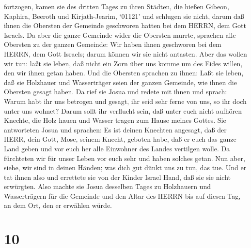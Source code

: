 fortzogen, kamen sie des dritten Tages zu ihren Städten, die hießen
Gibeon, Kaphira, Beeroth und Kirjath-Jearim,  `01121' und
schlugen sie nicht, darum daß ihnen die Obersten der Gemeinde geschworen
hatten bei dem HERRN, dem Gott Israels. Da aber die ganze Gemeinde wider
die Obersten murrte,  sprachen alle Obersten zu der ganzen
Gemeinde: Wir haben ihnen geschworen bei dem HERRN, dem Gott Israels;
darum können wir sie nicht antasten.  Aber das wollen wir
tun: laßt sie leben, daß nicht ein Zorn über uns komme um des Eides
willen, den wir ihnen getan haben.  Und die Obersten
sprachen zu ihnen: Laßt sie leben, daß sie Holzhauer und Wasserträger
seien der ganzen Gemeinde, wie ihnen die Obersten gesagt haben.
 Da rief sie Josua und redete mit ihnen und sprach: Warum
habt ihr uns betrogen und gesagt, ihr seid sehr ferne von uns, so ihr
doch unter uns wohnet?  Darum sollt ihr verflucht sein, daß
unter euch nicht aufhören Knechte, die Holz hauen und Wasser tragen zum
Hause meines Gottes.  Sie antworteten Josua und sprachen:
Es ist deinen Knechten angesagt, daß der HERR, dein Gott, Mose, seinem
Knecht, geboten habe, daß er euch das ganze Land geben und vor euch her
alle Einwohner des Landes vertilgen wolle. Da fürchteten wir für unser
Leben vor euch sehr und haben solches getan.  Nun aber,
siehe, wir sind in deinen Händen; was dich gut dünkt uns zu tun, das
tue.  Und er tat ihnen also und errettete sie von der
Kinder Israel Hand, daß sie sie nicht erwürgten.  Also
machte sie Josua desselben Tages zu Holzhauern und Wasserträgern für die
Gemeinde und den Altar des HERRN bis auf diesen Tag, an dem Ort, den er
erwählen würde.

\hypertarget{section-9}{%
\section{10}\label{section-9}}

